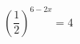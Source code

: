 \begin{ex}[type=equation]
	\begin{condition}
		\( \left( \dfrac{1}{2} \right)^{6-2x}=4 \)
	\end{condition}
\end{ex}